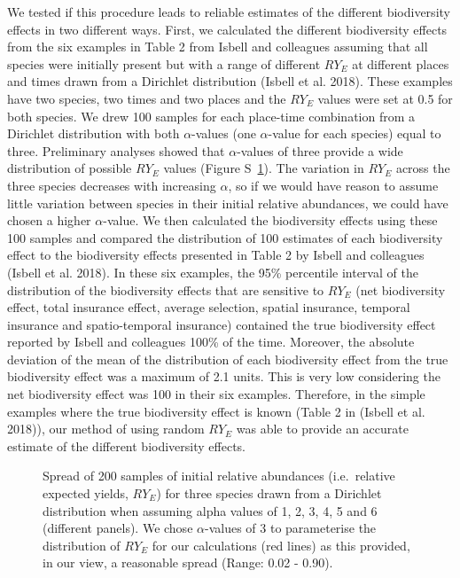 \documentclass[
  letterpaper,
  DIV=11,
  numbers=noendperiod]{scrartcl}
\begin{document}
We tested if this procedure leads to reliable estimates of the different
biodiversity effects in two different ways. First, we calculated the
different biodiversity effects from the six examples in Table 2 from
Isbell and colleagues assuming that all species were initially present
but with a range of different \(RY_E\) at different places and times
drawn from a Dirichlet distribution (Isbell et al. 2018). These examples
have two species, two times and two places and the \(RY_E\) values were
set at 0.5 for both species. We drew 100 samples for each place-time
combination from a Dirichlet distribution with both \(\alpha\)-values
(one \(\alpha\)-value for each species) equal to three. Preliminary
analyses showed that \(\alpha\)-values of three provide a wide
distribution of possible \(RY_E\) values (Figure S~\ref{fig-s7}). The
variation in \(RY_E\) across the three species decreases with increasing
\(\alpha\), so if we would have reason to assume little variation
between species in their initial relative abundances, we could have
chosen a higher \(\alpha\)-value. We then calculated the biodiversity
effects using these 100 samples and compared the distribution of 100
estimates of each biodiversity effect to the biodiversity effects
presented in Table 2 by Isbell and colleagues (Isbell et al. 2018). In
these six examples, the 95\% percentile interval of the distribution of
the biodiversity effects that are sensitive to \(RY_E\) (net
biodiversity effect, total insurance effect, average selection, spatial
insurance, temporal insurance and spatio-temporal insurance) contained
the true biodiversity effect reported by Isbell and colleagues 100\% of
the time. Moreover, the absolute deviation of the mean of the
distribution of each biodiversity effect from the true biodiversity
effect was a maximum of 2.1 units. This is very low considering the net
biodiversity effect was 100 in their six examples. Therefore, in the
simple examples where the true biodiversity effect is known (Table 2 in
(Isbell et al. 2018)), our method of using random \(RY_E\) was able to
provide an accurate estimate of the different biodiversity effects.

\begin{figure}


\caption{\label{fig-s7}Spread of 200 samples of initial relative
abundances (i.e.~relative expected yields, \(RY_E\)) for three species
drawn from a Dirichlet distribution when assuming alpha values of 1, 2,
3, 4, 5 and 6 (different panels). We chose \(\alpha\)-values of 3 to
parameterise the distribution of \(RY_E\) for our calculations (red
lines) as this provided, in our view, a reasonable spread (Range: 0.02 -
0.90).}

\end{figure}%
\end{document}
